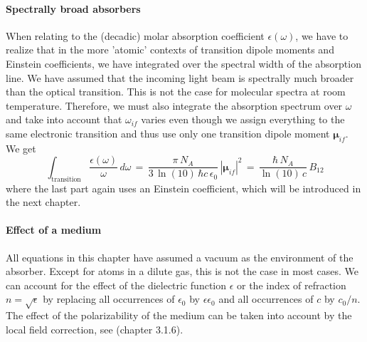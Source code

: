 \paragraph{Spectrally broad absorbers}
When relating to the (decadic) molar absorption coefficient $\epsilon(\omega)$, we have to realize that in the more 'atomic' contexts of transition dipole moments and Einstein coefficients, we have integrated over the spectral width of the absorption line. We have assumed that the incoming light beam is spectrally much broader than the optical transition. This is not the case for molecular spectra at room temperature. Therefore, we must also integrate the absorption spectrum over $\omega$ and take into account that $\omega_{if}$ varies even though we assign everything to the same electronic transition and thus use only one transition dipole moment $\mathbf{\mu}_{if}$. We get
\begin{equation}
 \int_{\text{transition}} \frac{\epsilon(\omega)}{\omega} \, d \omega \, = \, 
  \frac{\pi \, N_A}{ 3 \, \ln(10) \, \hbar c \, \epsilon_0} \,
 |\mathbf{\mu}_{if} |^2
 \, = \, 
  \frac{\hbar\, N_A}{ \ln(10) \, c } \,
B_{12}  \label{eq:1_epsilon_mu}
\end{equation}
where the last part again uses an Einstein coefficient, which will be introduced in the next chapter.


\paragraph*{Effect of a medium} All equations in this chapter have assumed a vacuum as the environment of the absorber. Except for atoms in a dilute gas, this is not the case in most cases. We can account for the effect of the dielectric function $\epsilon$ or the index of refraction $n = \sqrt{\epsilon}$ by replacing all occurrences of $\epsilon_0$ by $\epsilon \epsilon_0$ and all occurrences of $c$ by $c_0 / n$. The effect of the polarizability of the medium can be taken into account by the local field correction, see \cite{Parson} (chapter 3.1.6).


